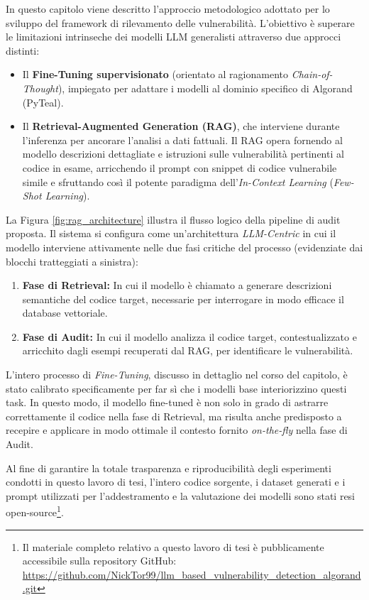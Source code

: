 \label{cap:metodologia}

In questo capitolo viene descritto l'approccio metodologico adottato per lo sviluppo del framework di rilevamento delle vulnerabilità. L'obiettivo è superare le limitazioni intrinseche dei modelli LLM generalisti attraverso due approcci distinti:

\begin{itemize}
    \item Il \textbf{Fine-Tuning supervisionato} (orientato al ragionamento \textit{Chain-of-Thought}), impiegato per adattare i modelli al dominio specifico di Algorand (PyTeal).
    \item Il \textbf{Retrieval-Augmented Generation (RAG)}, che interviene durante l'inferenza per ancorare l'analisi a dati fattuali. Il RAG opera fornendo al modello descrizioni dettagliate e istruzioni sulle vulnerabilità pertinenti al codice in esame, arricchendo il prompt con snippet di codice vulnerabile simile e sfruttando così il potente paradigma dell'\textit{In-Context Learning} (\textit{Few-Shot Learning}).
\end{itemize}

La Figura \ref{fig:rag_architecture} illustra il flusso logico della pipeline di audit proposta. Il sistema si configura come un'architettura \textit{LLM-Centric} in cui il modello interviene attivamente nelle due fasi critiche del processo (evidenziate dai blocchi tratteggiati a sinistra):

\begin{enumerate}
    \item \textbf{Fase di Retrieval:} In cui il modello è chiamato a generare descrizioni semantiche del codice target, necessarie per interrogare in modo efficace il database vettoriale.
    \item \textbf{Fase di Audit:} In cui il modello analizza il codice target, contestualizzato e arricchito dagli esempi recuperati dal RAG, per identificare le vulnerabilità.
\end{enumerate}

L'intero processo di \textit{Fine-Tuning}, discusso in dettaglio nel corso del capitolo, è stato calibrato specificamente per far sì che i modelli base interiorizzino questi task. In questo modo, il modello fine-tuned è non solo in grado di astrarre correttamente il codice nella fase di Retrieval, ma risulta anche predisposto a recepire e applicare in modo ottimale il contesto fornito \textit{on-the-fly} nella fase di Audit.

Al fine di garantire la totale trasparenza e riproducibilità degli esperimenti condotti in questo lavoro di tesi, l'intero codice sorgente, i dataset generati e i prompt utilizzati per l'addestramento e la valutazione dei modelli sono stati resi open-source\footnote{Il materiale completo relativo a questo lavoro di tesi è pubblicamente accessibile sulla repository GitHub: \url{https://github.com/NickTor99/llm_based_vulnerability_detection_algorand.git}}.


